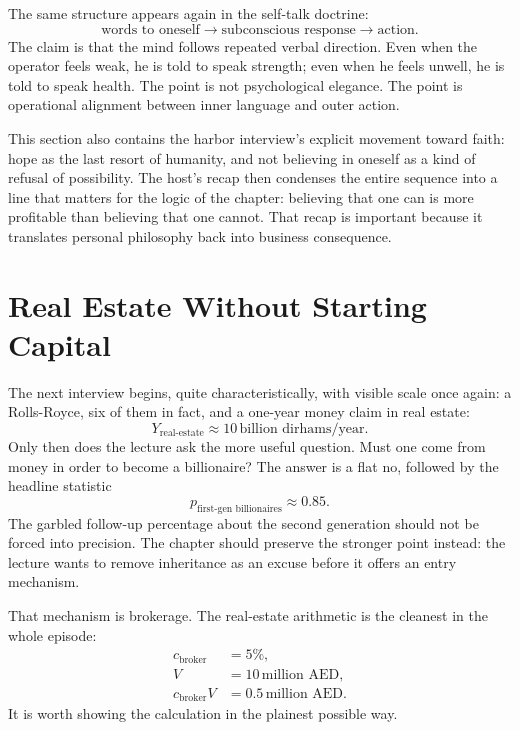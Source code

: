 The same structure appears again in the self-talk doctrine:
\begin{equation}
\text{words to oneself} \to \text{subconscious response} \to \text{action}.
\end{equation}
The claim is that the mind follows repeated verbal direction. Even when the operator feels weak, he is told to speak strength; even when he feels unwell, he is told to speak health. The point is not psychological elegance. The point is operational alignment between inner language and outer action.

This section also contains the harbor interview's explicit movement toward faith: hope as the last resort of humanity, and not believing in oneself as a kind of refusal of possibility. The host's recap then condenses the entire sequence into a line that matters for the logic of the chapter: believing that one can is more profitable than believing that one cannot. That recap is important because it translates personal philosophy back into business consequence.

\section{Real Estate Without Starting Capital}

The next interview begins, quite characteristically, with visible scale once again: a Rolls-Royce, six of them in fact, and a one-year money claim in real estate:
\begin{equation}
Y_{\text{real-estate}} \approx 10\,\text{billion dirhams/year}.
\end{equation}
Only then does the lecture ask the more useful question. Must one come from money in order to become a billionaire? The answer is a flat no, followed by the headline statistic
\begin{equation}
p_{\text{first-gen billionaires}} \approx 0.85.
\end{equation}
The garbled follow-up percentage about the second generation should not be forced into precision. The chapter should preserve the stronger point instead: the lecture wants to remove inheritance as an excuse before it offers an entry mechanism.

That mechanism is brokerage. The real-estate arithmetic is the cleanest in the whole episode:
\begin{align}
c_{\text{broker}} &= 5\%, \\
V &= 10\,\text{million AED}, \\
c_{\text{broker}}V &= 0.5\,\text{million AED}.
\end{align}
It is worth showing the calculation in the plainest possible way.

